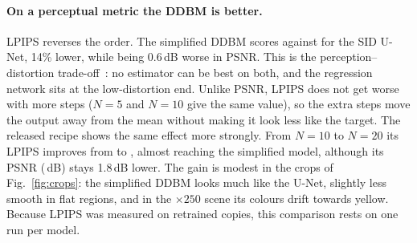 \paragraph{On a perceptual metric the DDBM is better.} LPIPS reverses the order. The simplified DDBM scores \DDBMREFIVELPIPS{} against \SIDRELPIPS{} for the SID U-Net, 14\% lower, while being 0.6\,dB worse in PSNR. This is the perception--distortion trade-off~\cite{blau2018perception}: no estimator can be best on both, and the regression network sits at the low-distortion end. Unlike PSNR, LPIPS does not get worse with more steps ($N=5$ and $N=10$ give the same value), so the extra steps move the output away from the mean without making it look less like the target. The released recipe shows the same effect more strongly. From $N=10$ to $N=20$ its LPIPS improves from \SONETENLPIPS{} to \SONETWENTYLPIPS{}, almost reaching the simplified model, although its PSNR (\SONETWENTYPSNR\,dB) stays 1.8\,dB lower. The gain is modest in the crops of Fig.~\ref{fig:crops}: the simplified DDBM looks much like the U-Net, slightly less smooth in flat regions, and in the $\times250$ scene its colours drift towards yellow. Because LPIPS was measured on retrained copies, this comparison rests on one run per model.

